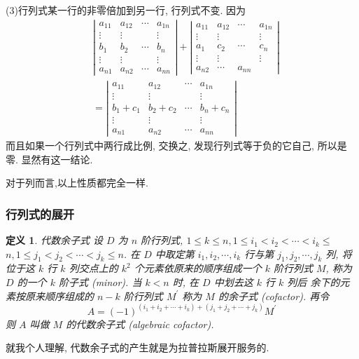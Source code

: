 \documentclass{article}
\newtheorem{mydef}{定义}
\begin{document}
	(3)行列式某一行的非零倍加到另一行, 行列式不变. 因为
	$$
	\begin{aligned}
		&\left|\begin{array}{cccc}
			a_{11} & a_{12} & \cdots & a_{1 n} \\
			\vdots & \vdots & & \vdots \\
			b_{1} & b_{2} & \cdots & b_{n} \\
			\vdots & \vdots & & \vdots \\
			a_{n 1} & a_{n 2} & \cdots & a_{n n}
		\end{array}\right|+\left|\begin{array}{ccccc}
			a_{11} & a_{12} & \cdots & a_{1 n} \\
			\vdots & \vdots & & \vdots \\
			a_{1} & c_{2} & \cdots & c_{n} \\
			\vdots & \vdots & & \vdots \\
			a_{n 2} & \cdots & a_{n n}
		\end{array}\right| \\
		&=\left|\begin{array}{ccccc}
			a_{11} & a_{12} & \cdots & a_{1 n} \\
			\vdots & \vdots & & \vdots \\
			b_{1}+c_{1} & b_{2}+c_{2} & \cdots & b_{n}+c_{n} \\
			\vdots & \vdots & & \vdots \\
			a_{n 1} & a_{n 2} & \cdots & a_{n n}
		\end{array}\right|
	\end{aligned}
	$$
	而且如果一个行列式中两行成比例, 交换之, 发现行列式等于负的它自己, 所以是零. 显然有这一结论.

	对于列而言,以上性质都完全一样.

\subsubsection{行列式的展开}

\begin{mydef}{代数余子式}
	设 $D$ 为 $n$ 阶行列式, $1 \leq k \leq n, 1 \leq i_{1}<i_{2}<\cdots<i_{k} \leq$ $n, 1 \leq j_{1}<j_{2}<\cdots<j_{k} \leq n$. 在 $D$ 中取定第 $i_{1}, i_{2}, \cdots, i_{k}$ 行与第 $j_{1}, j_{2}, \cdots, j_{k}$ 列, 将位于这 $k$ 行 $k$ 列交点上的 $k^{2}$ 个元素依原来的顺序组成一个 $k$ 阶行列式 $M$, 称为 $D$ 的一个 $k$ 阶子式 (minor). 当 $k<n$ 时, 在 $D$ 中划去这 $k$ 行 $k$ 列后 余下的元素按原来顺序组成的 $n-k$ 阶行列式 $M^{\prime}$ 称为 $M$ 的余子式 (cofactor). 再令
$$
A=(-1)^{\left(i_{1}+i_{2}+\cdots+i_{k}\right)+\left(j_{1}+j_{2}+\cdots+j_{k}\right)} M^{\prime}
$$
则 $A$ 叫做 $M$ 的代数余子式 (algebraic cofactor).
\end{mydef}
就我个人理解, 代数余子式的产生就是为拉普拉斯展开服务的.
\end{document}
